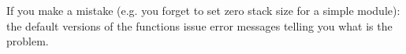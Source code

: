If you make a mistake (e.g. you forget to set zero stack size
 for a 
simple module): the default versions of the
functions issue error messages telling you what is the problem.




%
%
%
%
%
%
%
%
%
%
%
%


